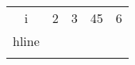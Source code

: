 \begin{tabular}{ c c c c c }
    i & 2 & 3 & 45 & 6 \\ 
    hline
     &  &  &  &  \\ 
     &  &  &  &  \\ 
\end{tabular}